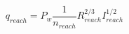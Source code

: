 \documentclass{article}
\begin{document}
 
$$
   q_{reach} = P_w \frac{1}{n_{reach}} R_{reach}^{2/3} I_{reach}^{1/2}
$$


 
\end{document}
